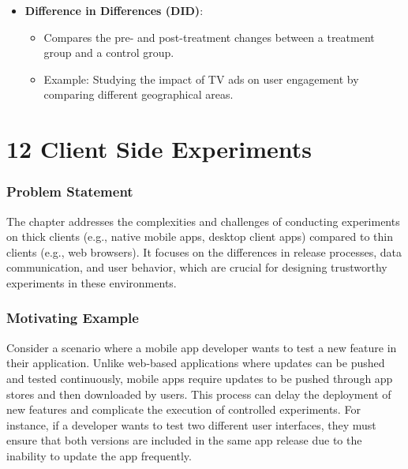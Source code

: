 \documentclass{article}
\begin{document}
\begin{itemize}
    \item \textbf{Difference in Differences (DID)}:
    \begin{itemize}
        \item Compares the pre- and post-treatment changes between a treatment group and a control group.
        \item Example: Studying the impact of TV ads on user engagement by comparing different geographical areas.
    \end{itemize}
\end{itemize}

\section*{12 Client Side Experiments}
\subsubsection*{Problem Statement}
The chapter addresses the complexities and challenges of conducting experiments on thick clients (e.g., native mobile apps, desktop client apps) compared to thin clients (e.g., web browsers). It focuses on the differences in release processes, data communication, and user behavior, which are crucial for designing trustworthy experiments in these environments.

\subsubsection*{Motivating Example}
Consider a scenario where a mobile app developer wants to test a new feature in their application. Unlike web-based applications where updates can be pushed and tested continuously, mobile apps require updates to be pushed through app stores and then downloaded by users. This process can delay the deployment of new features and complicate the execution of controlled experiments. For instance, if a developer wants to test two different user interfaces, they must ensure that both versions are included in the same app release due to the inability to update the app frequently.
\end{document}
